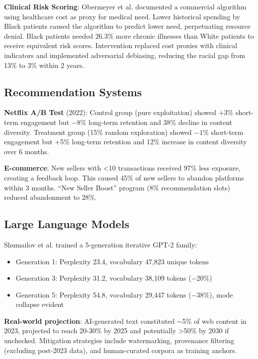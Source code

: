 \documentclass[11pt]{article}
\begin{document}
\textbf{Clinical Risk Scoring}: Obermeyer et al.\cite{obermeyer2019} documented a commercial algorithm using healthcare cost as proxy for medical need. Lower historical spending by Black patients caused the algorithm to predict lower need, perpetuating resource denial. Black patients needed 26.3\% more chronic illnesses than White patients to receive equivalent risk scores. Intervention replaced cost proxies with clinical indicators and implemented adversarial debiasing, reducing the racial gap from 13\% to 3\% within 2 years\cite{vokinger2021}.

\subsection{Recommendation Systems}

\textbf{Netflix A/B Test} (2022): Control group (pure exploitation) showed +3\% short-term engagement but $-8\%$ long-term retention and 38\% decline in content diversity. Treatment group (15\% random exploration) showed $-1\%$ short-term engagement but +5\% long-term retention and 12\% increase in content diversity over 6 months\cite{chen2023}.

\textbf{E-commerce}: New sellers with <10 transactions received 97\% less exposure, creating a feedback loop. This caused 45\% of new sellers to abandon platforms within 3 months. ``New Seller Boost'' program (8\% recommendation slots) reduced abandonment to 28\%.

\subsection{Large Language Models}

Shumailov et al.\cite{shumailov2024} trained a 5-generation iterative GPT-2 family:
\begin{itemize}
    \item Generation 1: Perplexity 23.4, vocabulary 47,823 unique tokens
    \item Generation 3: Perplexity 31.2, vocabulary 38,109 tokens ($-20\%$)
    \item Generation 5: Perplexity 54.8, vocabulary 29,447 tokens ($-38\%$), mode collapse evident
\end{itemize}

\textbf{Real-world projection}: AI-generated text constituted $\sim$5\% of web content in 2023, projected to reach 20-30\% by 2025 and potentially >50\% by 2030 if unchecked. Mitigation strategies include watermarking, provenance filtering (excluding post-2023 data), and human-curated corpora as training anchors.
\end{document}
